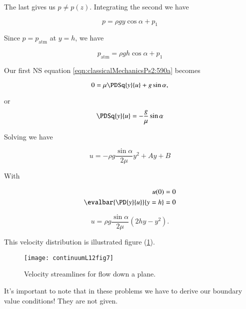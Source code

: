 The last gives us $p \ne p(z)$.  Integrating the second we have

\begin{equation}\label{eqn:continuumL12:410}
p = \rho g y \cos\alpha + p_1
\end{equation}

Since $p = p_{\text{atm}}$ at $y = h$, we have

\begin{equation}\label{eqn:continuumL12:430}
p_{\text{atm}} = \rho g h \cos\alpha + p_1
\end{equation}

Our first NS equation \ref{eqn:classicalMechanicsPs2:590a} becomes

\begin{equation}\label{eqn:continuumL12:450}
0 = \mu \PDSq{y}{u} + g \sin\alpha,
\end{equation}

or
\begin{equation}\label{eqn:continuumL12:470}
\PDSq{y}{u} = -\frac{g}{\mu} \sin\alpha
\end{equation}

Solving we have

\begin{equation}\label{eqn:continuumL12:490}
u = - \rho g \frac{\sin\alpha}{2 \mu} y^2 + A y + B
\end{equation}

With

\begin{align}\label{eqn:continuumL12:510}
u(0) &= 0 \\
\evalbar{\PD{y}{u}}{y = h} &= 0
\end{align}

\begin{equation}\label{eqn:classicalMechanicsPs2:530}
u = \rho g \frac{\sin\alpha}{2 \mu} \left( 2 h y - y^2 \right) .
\end{equation}

This velocity distribution is illustrated figure (\ref{fig:continuumL12:continuumL12fig7}).

\begin{figure}[htp]
   \centering
   \texttt{[image: continuumL12fig7]}
   \caption{Velocity streamlines for flow down a plane.}\label{fig:continuumL12:continuumL12fig7}
\end{figure}

It's important to note that in these problems we have to derive our boundary value conditions!  They are not given.

